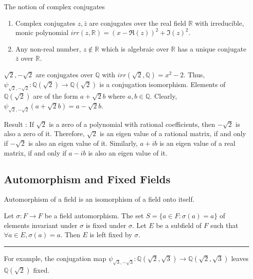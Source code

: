 \begin{commentary}
\begin{remark}
	The notion of complex conjugates
	\begin{enumerate}
		\item Complex conjugates $z,\bar{z}$ are conjugates over the real field $\mathbb{R}$ with irreducible, monic polynomial $irr(z,\mathbb{R}) = (x-\Re{(z)})^2+\Im{(z)}^2$.
		\item Any non-real number, $z \notin \mathbb{R}$ which is algebraic over $\mathbb{R}$ has a unique conjugate $\bar{z}$ over $\mathbb{R}$.
	\end{enumerate}
\end{remark}
\end{commentary}

\begin{remark}
	$\sqrt{2},-\sqrt{2}$ are conjugates over $\mathbb{Q}$ with $irr(\sqrt{2},\mathbb{Q}) = x^2-2$.
	Thus, $\psi_{\sqrt{2},-\sqrt{2}} : \mathbb{Q}(\sqrt{2}) \to \mathbb{Q}(\sqrt{2})$ is a conjugation isomorphism.
	Elements of $\mathbb{Q}(\sqrt{2})$ are of the form $a+\sqrt{2}b$ where $a,b \in \mathbb{Q}$.
	Clearly, $\psi_{\sqrt{2},-\sqrt{2}}(a+\sqrt{2}b) = a-\sqrt{2}b$.
\end{remark}
\begin{commentary}
	Result : 
	If $\sqrt{2}$ is a zero of a polynomial with rational coefficients, then $-\sqrt{2}$ is also a zero of it.
	Therefore, $\sqrt{2}$ is an eigen value of a rational matrix, if and only if $-\sqrt{2}$ is also an eigen value of it.
	Similarly, $a+ib$ is an eigen value of a real matrix, if and only if $a-ib$ is also an eigen value of it.
\end{commentary}
\subsection{Automorphism and Fixed Fields}
\begin{definition}[automorphism]
	Automorphism of a field is an isomorphism of a field onto itself.
\end{definition}
\begin{definition}[fixed]
	Let $\sigma : F \to F$ be a field automorphism.
	The set $S = \{ a \in F : \sigma(a) = a \}$ of elements invariant under $\sigma$ is fixed under $\sigma$.
	Let $E$ be  a subfield of $F$ such that $\forall a \in E, \sigma(a) = a$.
	Then $E$ is left fixed by $\sigma$.
\end{definition}
\hrule \vspace{1em}
For example, the conjugation map $\psi_{\sqrt{3},-\sqrt{3}} : \mathbb{Q}(\sqrt{2},\sqrt{3}) \to \mathbb{Q}(\sqrt{2},\sqrt{3})$ leaves $\mathbb{Q}(\sqrt{2})$ fixed.\\

